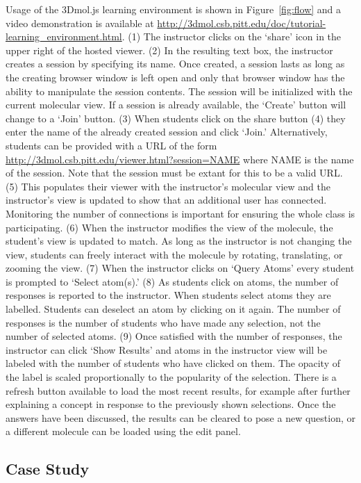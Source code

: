 \documentclass[journal=jceda8,manuscript=article]{achemso}
\begin{document}
Usage of the 3Dmol.js learning environment is shown in Figure~\ref{fig:flow} and a video demonstration is available at \url{http://3dmol.csb.pitt.edu/doc/tutorial-learning_environment.html}.  (1) The instructor clicks on the `share' icon in the upper right of the hosted viewer. (2) In the resulting text box, the instructor creates a session by specifying its name.  Once created, a session lasts as long as the creating browser window is left open and only that browser window has the ability to manipulate the session contents.  The session will be initialized with the current molecular view. If a session is already available, the `Create' button will change to a `Join' button.  (3) When students click on the share button (4) they enter the name of the already created session and click `Join.'  Alternatively, students can be provided with a URL of the form \url{http://3dmol.csb.pitt.edu/viewer.html?session=NAME} where NAME is the name of the session.  Note that the session must be extant for this to be a valid URL. (5) This populates their viewer with the instructor's molecular view and the instructor's view is updated to show that an additional user has connected.  Monitoring the number of connections is important for ensuring the whole class is participating.  (6) When the instructor modifies the view of the molecule, the student's view is updated to match.  As long as the instructor is not changing the view, students can freely interact with the molecule by rotating, translating, or zooming the view. (7) When the instructor clicks on `Query Atoms' every student is prompted to `Select atom(s).'  (8) As students click on atoms, the number of responses is reported to the instructor.  When students select atoms they are labelled.  Students can deselect an atom by clicking on it again.  The number of responses is the number of students who have made any selection, not the number of selected atoms. (9) Once satisfied with the number of responses, the instructor can click `Show Results' and atoms in the instructor view will be labeled with the number of students who have clicked on them.  The opacity of the label is scaled proportionally to the popularity of the selection.  There is a refresh button available to load the most recent results, for example after further explaining a concept in response to the previously shown selections.  Once the answers have been discussed, the results can be cleared to pose a new question, or a different molecule can be loaded using the edit panel.

\subsection{Case Study}
\end{document}

